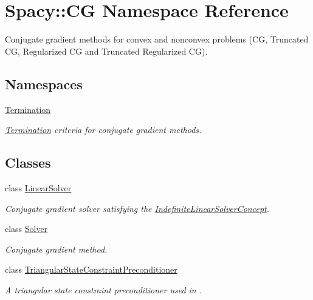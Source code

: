 \hypertarget{namespaceSpacy_1_1CG}{}\section{Spacy\+:\+:C\+G Namespace Reference}
\label{namespaceSpacy_1_1CG}


Conjugate gradient methods for convex and nonconvex problems (C\+G, Truncated C\+G, Regularized C\+G and Truncated Regularized C\+G).  


\subsection*{Namespaces}
\begin{DoxyCompactItemize}
\item 
 \hyperlink{namespaceSpacy_1_1CG_1_1Termination}{Termination}
\begin{DoxyCompactList}\small\item\em \hyperlink{namespaceSpacy_1_1CG_1_1Termination}{Termination} criteria for conjugate gradient methods. \end{DoxyCompactList}\end{DoxyCompactItemize}
\subsection*{Classes}
\begin{DoxyCompactItemize}
\item 
class \hyperlink{classSpacy_1_1CG_1_1LinearSolver}{Linear\+Solver}
\begin{DoxyCompactList}\small\item\em Conjugate gradient solver satisfying the \hyperlink{group__ConceptGroup_ga582dd34334cdecc7b27883f4e8239490_IndefiniteLinearSolverConceptAnchor}{Indefinite\+Linear\+Solver\+Concept}. \end{DoxyCompactList}\item 
class \hyperlink{classSpacy_1_1CG_1_1Solver}{Solver}
\begin{DoxyCompactList}\small\item\em Conjugate gradient method. \end{DoxyCompactList}\item 
class \hyperlink{classSpacy_1_1CG_1_1TriangularStateConstraintPreconditioner}{Triangular\+State\+Constraint\+Preconditioner}
\begin{DoxyCompactList}\small\item\em A triangular state constraint preconditioner used in \cite{Lubkoll2015a}. \end{DoxyCompactList}\end{DoxyCompactItemize}
